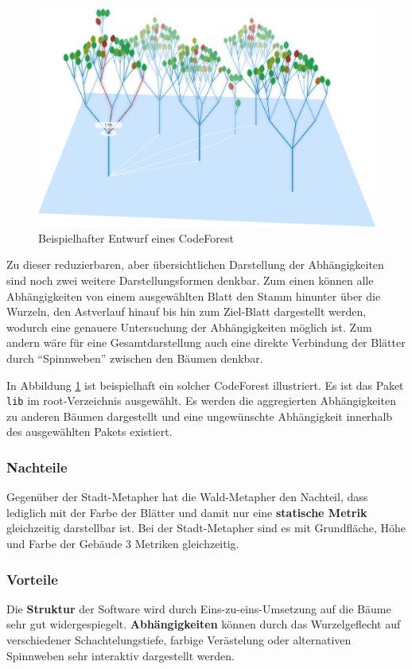 \begin{figure}[htbp]
	\centering
	\includegraphics[width=\linewidth]{figures/code-forest}
	\caption{Beispielhafter Entwurf eines CodeForest} \label{fig:code-forest}
\end{figure}

Zu dieser reduzierbaren, aber übersichtlichen Darstellung der Abhängigkeiten sind noch zwei weitere Darstellungsformen denkbar. Zum einen können alle Abhängigkeiten von einem ausgewählten Blatt den Stamm hinunter über die Wurzeln, den Astverlauf hinauf bis hin zum Ziel-Blatt dargestellt werden, wodurch eine genauere Untersuchung der Abhängigkeiten möglich ist. Zum andern wäre für eine Gesamtdarstellung auch eine direkte Verbindung der Blätter durch "`Spinnweben"' zwischen den Bäumen denkbar.

In Abbildung \ref{fig:code-forest} ist beispielhaft ein solcher CodeForest illustriert. Es ist das Paket \texttt{lib} im root-Verzeichnis ausgewählt. Es werden die aggregierten Abhängigkeiten zu anderen Bäumen dargestellt und eine ungewünschte Abhängigkeit innerhalb des ausgewählten Pakets existiert.

\subsubsection*{Nachteile}
Gegenüber der Stadt-Metapher hat die Wald-Metapher den Nachteil, dass lediglich mit der Farbe der Blätter und damit nur eine \textbf{statische Metrik} gleichzeitig darstellbar ist. Bei der Stadt-Metapher sind es mit Grundfläche, Höhe und Farbe der Gebäude 3 Metriken gleichzeitig.

\subsubsection*{Vorteile}
Die \textbf{Struktur} der Software wird durch Eins-zu-eins-Um­set­zung auf die Bäume sehr gut widergespiegelt. \textbf{Abhängigkeiten} können durch das Wurzelgeflecht auf verschiedener Schachtelungstiefe, farbige Verästelung oder alternativen Spinnweben sehr interaktiv dargestellt werden.

